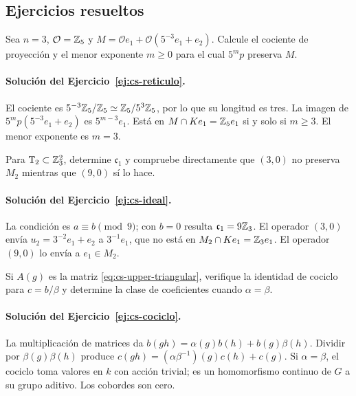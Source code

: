 \subsection{Ejercicios resueltos}

\begin{ejercicio}\label{ej:cs-reticulo}
Sea $n=3$, $\mathcal O=\mathbb{Z}_5$ y
$M=\mathcal Oe_1+\mathcal O(5^{-3}e_1+e_2)$.
Calcule el cociente de proyección y el menor exponente
$m\ge0$ para el cual $5^m p$ preserva $M$.
\end{ejercicio}

\paragraph{Solución del Ejercicio~\ref{ej:cs-reticulo}.}
El cociente es $5^{-3}\mathbb{Z}_5/\mathbb{Z}_5\simeq\mathbb{Z}_5/5^3\mathbb{Z}_5$,
por lo que su longitud es tres. La imagen de
$5^mp(5^{-3}e_1+e_2)$ es $5^{m-3}e_1$.
Está en $M\cap Ke_1=\mathbb{Z}_5e_1$ si y solo si $m\ge3$.
El menor exponente es $m=3$.

\begin{ejercicio}\label{ej:cs-ideal}
Para $\mathbb T_2\subset\mathbb{Z}_3^2$, determine
$\mathfrak c_1$ y compruebe directamente
que $(3,0)$ no preserva $M_2$ mientras que
$(9,0)$ sí lo hace.
\end{ejercicio}

\paragraph{Solución del Ejercicio~\ref{ej:cs-ideal}.}
La condición es $a\equiv b\pmod9$; con $b=0$
resulta $\mathfrak c_1=9\mathbb{Z}_3$.
El operador $(3,0)$ envía
$u_2=3^{-2}e_1+e_2$ a $3^{-1}e_1$, que no está
en $M_2\cap Ke_1=\mathbb{Z}_3e_1$.
El operador $(9,0)$ lo envía a $e_1\in M_2$.

\begin{ejercicio}\label{ej:cs-cociclo}
Si $A(g)$ es la matriz \eqref{eq:cs-upper-triangular},
verifique la identidad de cociclo para
$c=b/\beta$ y determine la clase de coeficientes
cuando $\alpha=\beta$.
\end{ejercicio}

\paragraph{Solución del Ejercicio~\ref{ej:cs-cociclo}.}
La multiplicación de matrices da
$b(gh)=\alpha(g)b(h)+b(g)\beta(h)$.
Dividir por $\beta(g)\beta(h)$ produce
$c(gh)=(\alpha\beta^{-1})(g)c(h)+c(g)$.
Si $\alpha=\beta$, el cociclo toma valores en
$k$ con acción trivial; es un homomorfismo
continuo de $G$ a su grupo aditivo. Los cobordes
son cero.


